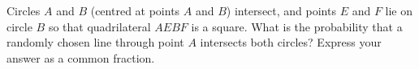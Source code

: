 Circles $A$ and $B$ (centred at points $A$ and $B$) intersect, and points $E$ and $F$ lie on circle $B$ so that quadrilateral $AEBF$ is a square. What is the probability that a randomly chosen line through point $A$ intersects both circles? Express your answer as a common fraction.
